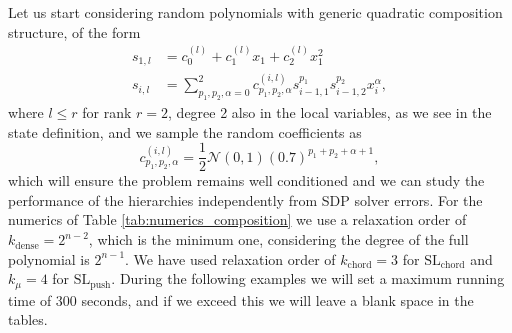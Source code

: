 \documentclass[11pt,a4paper]{article}
\theoremstyle{definition}
\begin{document}
Let us start considering random polynomials with generic quadratic composition structure, of the form
\begin{align*}
    s_{1,l}&=c_0^{(l)} + c_1^{(l)}x_1+c_2^{(l)} x_1^2\\
    s_{i,l}&=\sum_{p_1,p_2,\alpha=0}^2 c^{(i,l)}_{p_1,p_2,\alpha} s_{i-1,1}^{p_1}s_{i-1,2}^{p_2} x_i^{\alpha},
\end{align*}
where $l\leq r$ for rank $r=2$, degree 2 also in the local variables, as we see in the state definition, and we sample the random coefficients 
as
\[
c_{p_1,p_2,\alpha}^{(i,l)}=\frac{1}{2}\mathcal{N}(0,1)(0.7)^{p_1+p_2+\alpha+1},
\]
which will ensure the problem remains well conditioned and we can study the performance of the hierarchies independently from SDP solver errors.
For the numerics of Table \ref{tab:numerics_composition} we use a relaxation order of $k_{\text{dense}}=2^{n-2}$, which is the minimum one, considering the degree of the full polynomial is $2^{n-1}$. We have used relaxation order of $k_{\text{chord}}=3$ for $\mathrm{SL}_{\mathrm{chord}}$ and $k_{\mu}=4$ for $\mathrm{SL}_{\mathrm{push}}$. During the following examples we will set a maximum running time of $300$ seconds, and if we exceed this we will leave a blank space in the tables.
\end{document}
